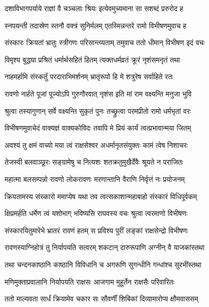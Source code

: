 \twolineshloka
{दशाविभागपर्याये राज्ञां वै चञ्चलाः श्रियः}
{इत्येवमुच्यमाना सा सशब्दं प्ररुरोद ह} %

\twolineshloka
{स्नपयन्ती तदास्रेण स्तनौ वक्त्रं सुनिर्मलम्}
{एतस्मिन्नन्तरे रामो विभीषणमुवाच ह} %

\twolineshloka
{संस्कारः क्रियतां भ्रातुः स्त्रीगणः परिसान्त्व्यताम्}
{तमुवाच ततो धीमान् विभीषण इदं वचः} %

\twolineshloka
{विमृश्य बुद्ध्या प्रश्रितं धर्मार्थसहितं हितम्}
{त्यक्तधर्मव्रतं क्रूरं नृशंसमनृतं तथा} %

\twolineshloka
{नाहमर्हामि संस्कर्तुं परदाराभिमर्शनम्}
{भ्रातृरूपो हि मे शत्रुरेष सर्वाहिते रतः} %

\twolineshloka
{रावणो नार्हते पूजां पूज्योऽपि गुरुगौरवात्}
{नृशंस इति मां राम वक्ष्यन्ति मनुजा भुवि} %

\twolineshloka
{श्रुत्वा तस्यागुणान् सर्वे वक्ष्यन्ति सुकृतं पुनः}
{तच्छ्रुत्वा परमप्रीतो रामो धर्मभृतां वरः} %

\twolineshloka
{विभीषणमुवाचेदं वाक्यज्ञं वाक्यकोविदः}
{तवापि मे प्रियं कार्यं त्वत्प्रभावान्मया जितम्} %

\twolineshloka
{अवश्यं तु क्षमं वाच्यो मया त्वं राक्षसेश्वर}
{अधर्मानृतसंयुक्तः कामं त्वेष निशाचरः} %

\twolineshloka
{तेजस्वी बलवाञ्छूरः सङ्ग्रामेषु च नित्यशः}
{शतक्रतुमुखैर्देवैः श्रूयते न पराजितः} %

\twolineshloka
{महात्मा बलसम्पन्नो रावणो लोकरावणः}
{मरणान्तानि वैराणि निर्वृत्तं नः प्रयोजनम्} %

\twolineshloka
{क्रियतामस्य संस्कारो ममाप्येष यथा तव}
{त्वत्सकाशान्महाबाहो संस्कारं विधिपूर्वकम्} %

\twolineshloka
{क्षिप्रमर्हति धर्मेण त्वं यशोभाग् भविष्यसि}
{राघवस्य वचः श्रुत्वा त्वरमाणो विभीषणः} %

\twolineshloka
{संस्कारयितुमारेभे भ्रातरं रावणं हतम्}
{स प्रविश्य पुरीं लङ्कां राक्षसेन्द्रो विभीषणः} %

\twolineshloka
{रावणस्याग्निहोत्रं तु निर्यापयति सत्वरम्}
{शकटान् दारुरूपाणि अग्नीन् वै याजकांस्तथा} %

\twolineshloka
{तथा चन्दनकाष्ठानि काष्ठानि विविधानि च}
{अगरूणि सुगन्धीनि गन्धांश्च सुरभींस्तथा} %

\twolineshloka
{मणिमुक्ताप्रवालानि निर्यापयति राक्षसः}
{आजगाम मुहूर्तेन राक्षसैः परिवारितः} %

\twolineshloka
{ततो माल्यवता सार्धं क्रियामेव चकार सः}
{सौवर्णीं शिबिकां दिव्यामारोप्य क्षौमवाससम्} %

